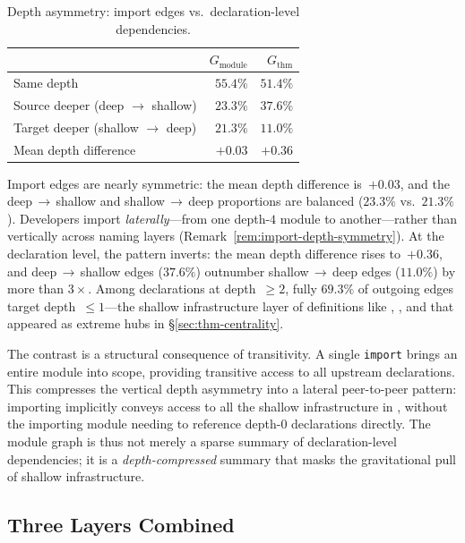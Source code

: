 \begin{table}[ht]
\centering
\caption{Depth asymmetry: import edges vs.\ declaration-level dependencies.}
\label{tab:depth-asymmetry}
\begin{tabular}{lrr}
\toprule
& $G_{\mathrm{module}}$ & $G_{\mathrm{thm}}$ \\
\midrule
Same depth                         & $55.4\%$ & $51.4\%$ \\
Source deeper (deep $\to$ shallow) & $23.3\%$ & $37.6\%$ \\
Target deeper (shallow $\to$ deep) & $21.3\%$ & $11.0\%$ \\
Mean depth difference              & $+0.03$  & $+0.36$  \\
\bottomrule
\end{tabular}
\end{table}

Import edges are nearly symmetric: the mean depth difference is~$+0.03$, and the deep$\,\to\,$shallow and shallow$\,\to\,$deep proportions are balanced ($23.3\%$ vs.\ $21.3\%$). Developers import \emph{laterally}---from one depth-$4$ module to another---rather than vertically across naming layers (Remark~\ref{rem:import-depth-symmetry}). At the declaration level, the pattern inverts: the mean depth difference rises to~$+0.36$, and deep$\,\to\,$shallow edges ($37.6\%$) outnumber shallow$\,\to\,$deep edges ($11.0\%$) by more than $3{\times}$. Among declarations at depth~$\ge 2$, fully $69.3\%$ of outgoing edges target depth~$\le 1$---the shallow infrastructure layer of definitions like , , and  that appeared as extreme hubs in \S\ref{sec:thm-centrality}.

The contrast is a structural consequence of transitivity. A single \texttt{import} brings an entire module into scope, providing transitive access to all upstream declarations. This compresses the vertical depth asymmetry into a lateral peer-to-peer pattern: importing  implicitly conveys access to all the shallow infrastructure in , without the importing module needing to reference depth-$0$ declarations directly. The module graph is thus not merely a sparse summary of declaration-level dependencies; it is a \emph{depth-compressed} summary that masks the gravitational pull of shallow infrastructure.

\subsection{Three Layers Combined}
\label{sec:three-layers}

